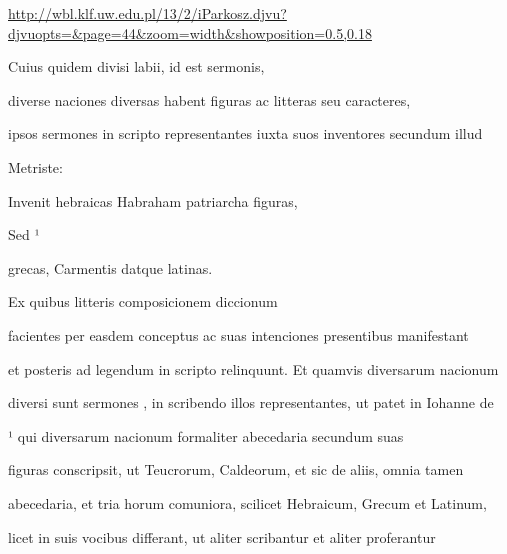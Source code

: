 
\newParkoszpage


\url{http://wbl.klf.uw.edu.pl/13/2/iParkosz.djvu?djvuopts=&page=44&zoom=width&showposition=0.5,0.18}

\fullpreviouslines


{
\color{blue}

Cuius quidem divisi labii, id est sermonis,

diverse naciones diversas habent figuras ac litteras seu caracteres,
}


\fulllines

ipsos sermones in scripto representantes iuxta suos inventores secundum illud

\splitlines{}

Metriste:

\indentKcyt Invenit hebraicas Habraham patriarcha figuras,


\indentKcyt Sed ¹

\splitlines{}

\indentKcyt \phantom{Sed Catius}grecas, Carmentis datque latinas.

\indentK Ex quibus litteris composicionem diccionum

\fulllines{}

facientes per easdem conceptus ac suas intenciones presentibus manifestant

et posteris ad legendum in scripto relinquunt. Et quamvis diversarum nacionum

diversi sunt sermones , in scribendo illos representantes, ut patet in Iohanne de


¹ qui diversarum nacionum formaliter abecedaria secundum suas

figuras conscripsit, ut Teucrorum, Caldeorum, et sic de aliis, omnia tamen

abecedaria, et tria horum comuniora, scilicet Hebraicum, Grecum et Latinum,

licet in suis vocibus differant, ut aliter scribantur et aliter proferantur

